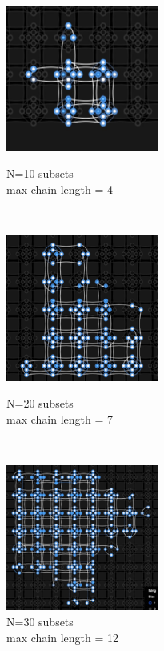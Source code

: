 \documentclass[oneside,a4paper]{article}
\begin{document}
\begin{figure}[htp]
\begin{minipage}[b]{4.5cm}

\includegraphics[width=5cm]{LaTeXTemplate/Images/2000Qfirst10.png}
\caption{N=10 subsets\\max chain length = 4}
\end{minipage}
\ \hspace{2mm} \hspace{2mm} \
\begin{minipage}[b]{4.5cm}

\includegraphics[width=5cm]{LaTeXTemplate/Images/2000Qfirst20.png}
\caption{N=20 subsets\\max chain length = 7}
\end{minipage}
\ \hspace{2mm} \hspace{2mm} \
\begin{minipage}[b]{4.5cm}
\centering
\includegraphics[width=5cm]{LaTeXTemplate/Images/2000Qfirst30.png}
\caption{N=30 subsets\\max chain length = 12}
\end{minipage}
\end{figure}
\end{document}
